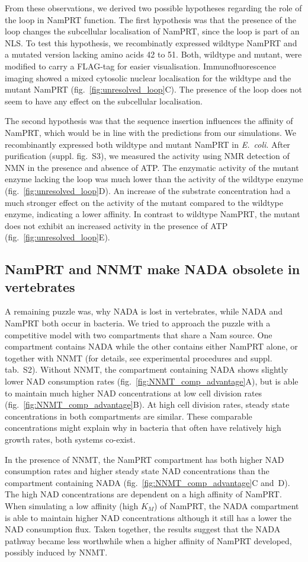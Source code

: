 From these observations, we derived two possible hypotheses regarding the role of the loop in NamPRT function. The first hypothesis was that the presence of the loop changes the subcellular localisation of NamPRT, since the loop is part of an NLS. To test this hypothesis, we recombinatly expressed wildtype NamPRT and a mutated version lacking amino acids 42 to 51. Both, wildtype and mutant, were modified to carry a FLAG-tag for easier visualisation. Immunofluorescence imaging showed a mixed cytosolic nuclear localisation for the wildtype and the mutant NamPRT (fig.~\ref{fig:unresolved_loop}C). The presence of the loop does not seem to have any effect on the subcellular localisation.

The second hypothesis was that the sequence insertion influences the affinity of NamPRT, which would be in line with the predictions from our simulations. We recombinantly expressed both wildtype and mutant NamPRT in \textit{E.~coli}. After purification (suppl. fig.~S3), we measured the activity using NMR detection of NMN in the presence and absence of ATP. The enzymatic activity of the mutant enzyme lacking the loop was much lower than the activity of the wildtype enzyme (fig.~\ref{fig:unresolved_loop}D). An increase of the substrate concentration had a much stronger effect on the activity of the mutant compared to the wildtype enzyme, indicating a lower affinity. In contrast to wildtype NamPRT, the mutant does not exhibit an increased activity in the presence of ATP (fig.~\ref{fig:unresolved_loop}E).


\subsection{NamPRT and NNMT make NADA obsolete in vertebrates}

A remaining puzzle was, why NADA is lost in vertebrates, while NADA and NamPRT both occur in bacteria. We tried to approach the puzzle with a competitive model with two compartments that share a Nam source. One compartment contains NADA while the other contains either NamPRT alone, or together with NNMT (for details, see experimental procedures and suppl. tab.~S2). Without NNMT, the compartment containing NADA shows slightly lower NAD consumption rates (fig.~\ref{fig:NNMT_comp_advantage}A), but is able to maintain much higher NAD concentrations at low cell division rates (fig.~\ref{fig:NNMT_comp_advantage}B). At high cell division rates, steady state concentrations in both compartments are similar. These comparable concentrations might explain why in bacteria that often have relatively high growth rates, both systems co-exist.

In the presence of NNMT, the NamPRT compartment has both higher NAD consumption rates and higher steady state NAD concentrations than the compartment containing NADA (fig.~\ref{fig:NNMT_comp_advantage}C and~D). The high NAD concentrations are dependent on a high affinity of NamPRT. When simulating a low affinity (high $K_{M}$) of NamPRT, the NADA compartment is able to maintain higher NAD concentrations although it still has a lower the NAD consumption flux. Taken together, the results suggest that the NADA pathway became less worthwhile when a higher affinity of NamPRT developed, possibly induced by NNMT.
